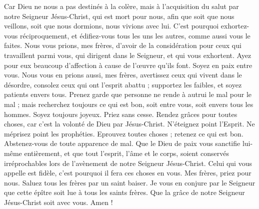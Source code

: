 \begin{multicols}{2}
Car Dieu ne nous a pas destinés à la colère, mais à l'acquisition du salut par notre Seigneur Jésus-Christ,
qui est mort pour nous, afin que soit que nous veillons, soit que nous dormions, nous vivions avec lui.
C'est pourquoi exhortez-vous réciproquement, et édifiez-vous tous les uns les autres, comme aussi vous le faites.
Nous vous prions, mes frères, d'avoir de la considération pour ceux qui travaillent parmi vous, qui dirigent dans le Seigneur, et qui vous exhortent.
Ayez pour eux beaucoup d'affection à cause de l'œuvre qu'ils font. Soyez en paix entre vous.
Nous vous en prions aussi, mes frères, avertissez ceux qui vivent dans le désordre, consolez ceux qui ont l'esprit abattu ; supportez les faibles, et soyez patients envers tous.
Prenez garde que personne ne rende à autrui le mal pour le mal ; mais recherchez toujours ce qui est bon, soit entre vous, soit envers tous les hommes.
Soyez toujours joyeux.
Priez sans cesse.
Rendez grâces pour toutes choses, car c'est la volonté de Dieu par Jésus-Christ.
N'éteignez point l'Esprit.
Ne méprisez point les prophéties.
Eprouvez toutes choses ; retenez ce qui est bon.
Abstenez-vous de toute apparence de mal.
Que le Dieu de paix vous sanctifie lui-même entièrement, et que tout l'esprit, l'âme et le corps, soient conservés irréprochables lors de l'avènement de notre Seigneur Jésus-Christ.
Celui qui vous appelle est fidèle, c'est pourquoi il fera ces choses en vous.
Mes frères, priez pour nous.
Saluez tous les frères par un saint baiser.
Je vous en conjure par le Seigneur que cette épître soit lue à tous les saints frères.
Que la grâce de notre Seigneur Jésus-Christ soit avec vous. Amen !
\PPE{}
\end{multicols}
